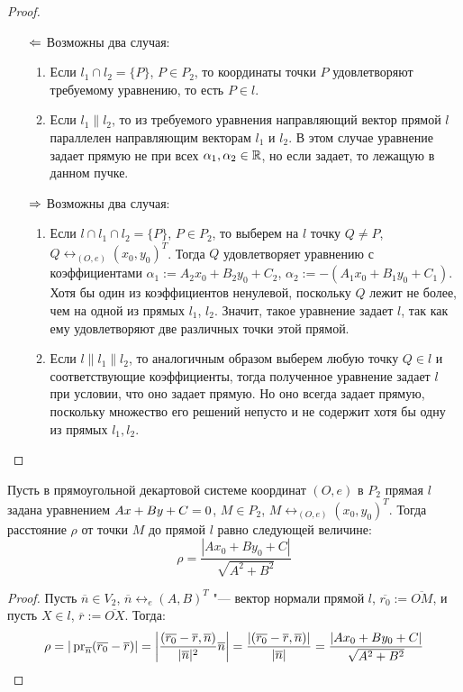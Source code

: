     \begin{proof}~
    	\begin{itemize}
    		\item[$\Leftarrow$] Возможны два случая:
    		\begin{enumerate}
    			\item Если $l_1 \cap l_2 = \{P\}$, $P \in P_2$, то координаты точки $P$ удовлетворяют требуемому уравнению, то есть $P \in l$.
    			\item Если $l_1 \parallel l_2$, то из требуемого уравнения направляющий вектор прямой $l$ параллелен направляющим векторам $l_1$ и $l_2$. В этом случае уравнение задает прямую не при всех $\alpha_1, \alpha_2 \in \mathbb{R}$, но если задает, то лежащую в данном пучке.
    		\end{enumerate}
    		
    		\item[$\Rightarrow$] Возможны два случая:
    		\begin{enumerate}
    			\item Если $l \cap l_1 \cap l_2 = \{P\}$, $P \in P_2$, то выберем на $l$ точку $Q \ne P$, $Q \leftrightarrow_{(O, e)} (x_0, y_0)^T$. Тогда $Q$ удовлетворяет уравнению с коэффициентами $\alpha_1 := A_2x_0+B_2y_0+C_2$, $\alpha_2 := -(A_1x_0+B_1y_0+C_1)$. Хотя бы один из коэффициентов ненулевой, поскольку $Q$ лежит не более, чем на одной из прямых $l_1$, $l_2$. Значит, такое уравнение задает $l$, так как ему удовлетворяют две различных точки этой прямой.
    			
    			\item Если $l \parallel l_1 \parallel l_2$, то аналогичным образом выберем любую точку $Q \in l$ и соответствующие коэффициенты, тогда полученное уравнение задает $l$ при условии, что оно задает прямую. Но оно всегда задает прямую, поскольку множество его решений непусто и не содержит хотя бы одну из прямых $l_1, l_2$.\qedhere
    		\end{enumerate}
    	\end{itemize}
    \end{proof}
    
    \begin{proposition}
    	Пусть в прямоугольной декартовой системе координат $(O, e)$ в $P_2$ прямая $l$ задана  уравнением $Ax\hm{+}By+C=0$, $M \in P_2$, $M \leftrightarrow_{(O, e)} (x_0, y_0)^T$. Тогда расстояние $\rho$ от точки $M$ до прямой $l$ равно следующей величине:
    	\[\rho = \frac{|Ax_0 + By_0 + C|}{\sqrt{A^2 + B^2}}\]
    \end{proposition}
    
    \begin{proof}
    	Пусть $\overline{n} \in V_2$, $\overline n \leftrightarrow_{e} (A, B)^T$ "--- вектор нормали прямой $l$, $\overline{r_0} := \overline{OM}$, и пусть $X \in l$, $\overline{r} := \overline{OX}$. Тогда:
    	\[\rho = |\operatorname{pr}_{\overline{n}}(\overline{r_0} - \overline{r})|
    	=
    	\left|\frac{(\overline{r_0} - \overline{r}, \overline{n})}{|\overline{n}|^2}\overline{n}\right|
    	=
    	\frac{|(\overline{r_0} - \overline{r}, \overline{n})|}{|\overline{n}|}
    	=
    	\frac{|Ax_0 + By_0 + C|}{\sqrt{A^2 + B^2}}\qedhere\]
    \end{proof}
